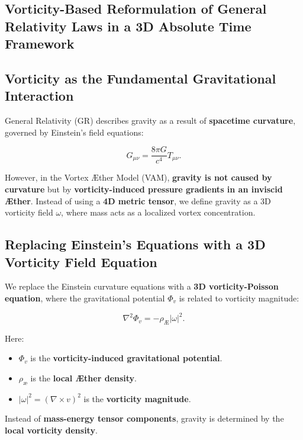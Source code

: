     \subsection{Vorticity-Based Reformulation of General Relativity Laws in a 3D Absolute Time Framework}

    \subsection*{Vorticity as the Fundamental Gravitational Interaction}

    General Relativity (GR) describes gravity as a result of \textbf{spacetime curvature}, governed by Einstein's field equations:

    \begin{equation*}
        G_{\mu\nu} = \frac{8\pi G}{c^4} T_{\mu\nu}.
    \end{equation*}

    However, in the Vortex Æther Model (VAM), \textbf{gravity is not caused by curvature} but by \textbf{vorticity-induced pressure gradients in an inviscid Æther}. Instead of using a \textbf{4D metric tensor}, we define gravity as a 3D vorticity field \( \omega \), where mass acts as a localized vortex concentration.

    \subsection*{Replacing Einstein's Equations with a 3D Vorticity Field Equation}

    We replace the Einstein curvature equations with a \textbf{3D vorticity-Poisson equation}, where the gravitational potential \( \Phi_v \) is related to vorticity magnitude:

    \begin{equation*}
        \nabla^2 \Phi_v = - \rho_\text{Æ} |\omega|^2.
    \end{equation*}

    Here:
    \begin{itemize}
        \item  \( \Phi_v \) is the \textbf{vorticity-induced gravitational potential}.
        \item  \( \rho_\text{\ae} \) is the \textbf{local Æther density}.
        \item  \( |\omega|^2 = (\nabla \times v)^2 \) is the \textbf{vorticity magnitude}.
    \end{itemize}

    Instead of \textbf{mass-energy tensor components}, gravity is determined by the \textbf{local vorticity density}.



